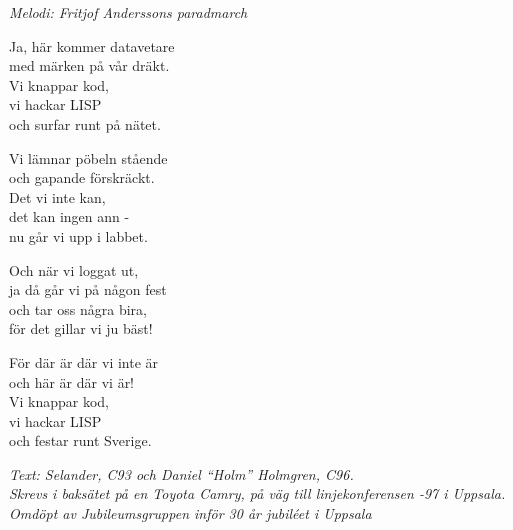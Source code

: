 {\footnotesize\textit{Melodi: Fritjof Anderssons paradmarch}}\par
\vspace{10pt}
Ja, här kommer datavetare\\
med märken på vår dräkt.\\
Vi knappar kod, \\
vi hackar LISP\\
och surfar runt på nätet.\par
\vspace{10pt}
Vi lämnar pöbeln stående\\
och gapande förskräckt.\\
Det vi inte kan, \\
det kan ingen ann -\\
nu går vi upp i labbet.\par
\vspace{10pt}
Och när vi loggat ut,\\
ja då går vi på någon fest\\
och tar oss några bira,\\
för det gillar vi ju bäst!\par
\vspace{10pt}
För där är där vi inte är\\
och här är där vi är!\\
Vi knappar kod,\\
vi hackar LISP\\
och festar runt Sverige.\par
\vspace{10pt}
{\footnotesize\textit{Text: Selander, C93 och Daniel ``Holm''
    Holmgren, C96.\\ Skrevs i baksätet på en Toyota Camry, på väg
    till linjekonferensen -97 i Uppsala. Omdöpt av Jubileumsgruppen
    inför 30 år jubiléet i Uppsala}}
